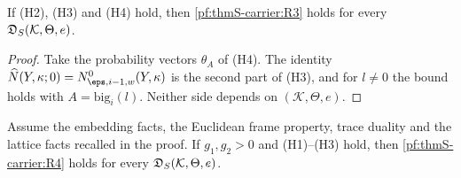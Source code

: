 \begin{lemma}\label{pf:thmS-carrier:wave}
If (H2), (H3) and (H4) hold, then \ref{pf:thmS-carrier:R3} holds for every $\mathfrak{D}_S(\mathcal K,\Theta,e)$.
\end{lemma}

\begin{proof}
Take the probability vectors $\theta_A$ of (H4). The identity $\thmScarrierNhat(Y,\kappa;0)=\thmScarrierNz_{\eps,i-1,w}(Y,
\kappa)$ is the second part of (H3), and for $l\ne0$ the bound holds with $A=\mathrm{big}_i(l)$. Neither side depends on
$(\mathcal K,\Theta,e)$.
\end{proof}

\begin{lemma}\label{pf:thmS-carrier:poisson}
Assume the embedding facts, the Euclidean frame property, trace duality and the lattice facts recalled in the proof. If
$g_1,g_2>0$ and (H1)--(H3) hold, then \ref{pf:thmS-carrier:R4} holds for every $\mathfrak{D}_S(\mathcal K,\Theta,e)$.
\end{lemma}


